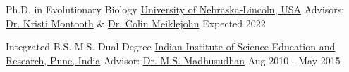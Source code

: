 

\begin{cventries}

  \eduentry
    {Ph.D. in Evolutionary Biology}  %
    {\href{https://biosci.unl.edu/}{University of Nebraska-Lincoln, USA}}  %
    {Advisors: \href{http://montoothlab.unl.edu/}{Dr. Kristi Montooth} \& \href{http://meiklejohnlab.unl.edu/}{Dr. Colin Meiklejohn}}  %
    {Expected 2022}  %

  \vspace{2.0mm} %

  \eduentry
    {Integrated B.S.-M.S. Dual Degree} %
    {\href{https://www.iiserpune.ac.in/}{Indian Institute of Science Education and Research, Pune, India}} %
    {Advisor: \href{http://cospi.iiserpune.ac.in/cospi/}{Dr. M.S. Madhusudhan}} %
    {Aug 2010 - May 2015} %

\end{cventries}
